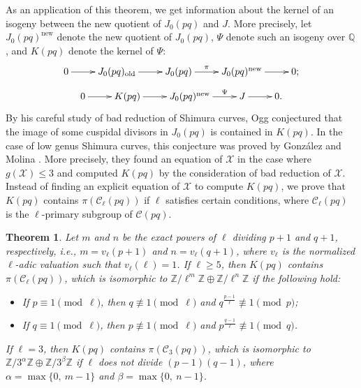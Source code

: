\documentclass[a4paper, 12pt]{amsart}
\newtheorem{thm}{Theorem}[section]
\theoremstyle{definition}
\theoremstyle{remark}
\numberwithin{equation}{section} \numberwithin{table}{section}
\begin{document}
As an application of this theorem, we get information about the kernel of an isogeny between the new quotient of $J_0(pq)$ and $J$. More precisely, let $J_0(pq)^{{\mathrm{new}}}$ denote the new quotient of $J_0(pq)$,
$\Psi$ denote such an isogeny over ${{\mathbb{Q}}}$, and $K(pq)$ denote the kernel of $\Psi$:
$$
\xymatrix{
0 \ar[r] & J_0(pq)_{{\mathrm{old}}} \ar[r] & J_0(pq) \ar[r]^-{\pi} & J_0(pq)^{{\mathrm{new}}} \ar[r] & 0;
}
$$
$$
\xymatrix{
0\ar[r] & K(pq) \ar[r] & J_0(pq)^{{\mathrm{new}}} \ar[r]^-{\Psi} & J \ar[r] & 0.
}
$$
By his careful study of bad reduction of Shimura curves, Ogg \cite{Og85} conjectured that the image of some cuspidal divisors in $J_0(pq)$ is contained in $K(pq)$. In the case of low genus Shimura curves, this conjecture was proved by Gonz\'alez and Molina \cite{GM11}.
More precisely, they found an equation of ${{\mathcal{X}}}$ in the case where $g({{\mathcal{X}}}) \leq 3$ and computed $K(pq)$ by the consideration of bad reduction of ${{\mathcal{X}}}$.
Instead of finding an explicit equation of ${{\mathcal{X}}}$ to compute $K(pq)$, we prove that $K(pq)$ contains $\pi({{\mathcal{C}}}_{\ell}(pq))$ if $\ell$ satisfies certain conditions, where ${{\mathcal{C}}}_{\ell}(pq)$ is the $\ell$-primary subgroup of ${{\mathcal{C}}}(pq)$.

\begin{thm}\label{thm:kernelofisogeny}
Let $m$ and $n$ be the exact powers of $\ell$ dividing $p+1$ and $q+1$, respectively, i.e., $m=v_{\ell}(p+1)$ and $n=v_{\ell}(q+1)$, where $v_{\ell}$ is the normalized $\ell$-adic valuation such that $v_{\ell}(\ell)=1$.
If $\ell\geq 5$, then $K(pq)$ contains $\pi({{\mathcal{C}}}_{\ell}(pq))$, which is isomorphic to ${{{{\mathbb{Z}}}/{{\ell^m}}{{\mathbb{Z}}}}} \oplus {{{{\mathbb{Z}}}/{{\ell^n}}{{\mathbb{Z}}}}}$ if the following hold:
\begin{itemize}
\item If $p\equiv 1 {{ \!\pmod {\ell}}}$, then $q\not\equiv 1 {{ \!\pmod {\ell}}}$ and $q^{\frac{p-1}{\ell}} \not\equiv 1 \pmod p$;
\item If $q\equiv 1 {{ \!\pmod {\ell}}}$, then $p\not\equiv 1 {{ \!\pmod {\ell}}}$ and $p^{\frac{q-1}{\ell}} \not\equiv 1 \pmod q$.
\end{itemize}
If $\ell=3$, then $K(pq)$ contains $\pi({{\mathcal{C}}}_3(pq))$, which is isomorphic to ${{{{\mathbb{Z}}}/{{3^{\alpha}}}{{\mathbb{Z}}}}} \oplus {{{{\mathbb{Z}}}/{{3^{\beta}}}{{\mathbb{Z}}}}}$ if $\ell$ does not divide $(p-1)(q-1)$, where $\alpha=\max \{0,~m-1\}$ and $\beta=\max \{0, ~n-1\}$.
\end{thm}
\end{document}
